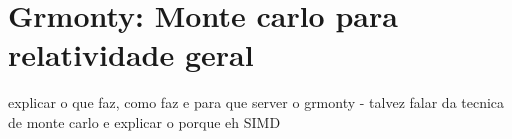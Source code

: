 \chapter{Grmonty: Monte carlo para relatividade geral}
\label{cap:grmonty}

explicar o que faz, como faz e para que server o grmonty - talvez falar da tecnica de monte carlo e explicar o porque eh SIMD
